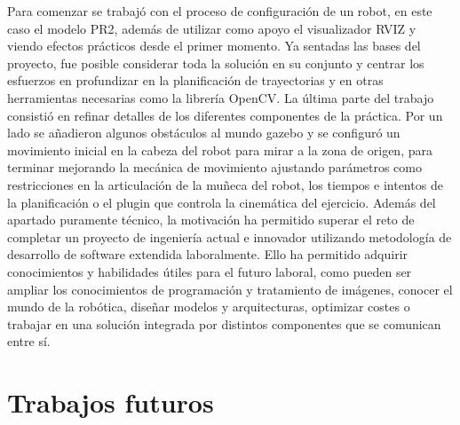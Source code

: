 \documentclass[12pt,spanish,chapterprefix, numbers=noenddot]{book}
\numberwithin{equation}{section}
\numberwithin{figure}{section}
\begin{document}
Para comenzar se trabajó con el proceso de configuración de un robot, en este caso el modelo PR2, además de utilizar como apoyo el visualizador RVIZ y viendo efectos prácticos desde el primer momento. 
Ya sentadas las bases del proyecto, fue posible considerar toda la solución en su conjunto y centrar los esfuerzos en profundizar en la planificación de trayectorias y en otras herramientas necesarias como la librería OpenCV. La última parte del trabajo consistió en refinar detalles de los diferentes componentes de la práctica. Por un lado se añadieron algunos obstáculos al mundo gazebo y se configuró un movimiento inicial en la cabeza del robot para mirar a la zona de origen, para terminar mejorando la mecánica de movimiento ajustando parámetros como restricciones en la articulación de la muñeca del robot, los tiempos e intentos de la planificación o el plugin que controla la cinemática del ejercicio.
Además del apartado puramente técnico, la motivación ha permitido superar el reto de completar un proyecto de ingeniería actual e innovador utilizando metodología de desarrollo de software extendida laboralmente. Ello ha permitido adquirir conocimientos y habilidades útiles para el futuro laboral, como pueden ser ampliar los conocimientos de programación y tratamiento de imágenes, conocer el mundo de la robótica, diseñar modelos y arquitecturas, optimizar costes o trabajar en una solución integrada por distintos componentes que se comunican entre sí.  

\section{Trabajos futuros}
\end{document}
